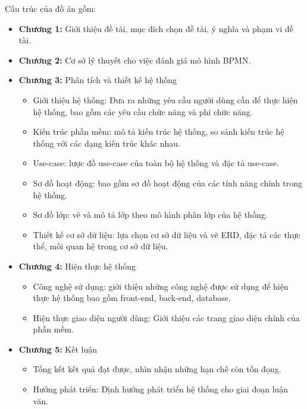 Cấu trúc của đồ án gồm:
\begin{itemize}
    \item \textbf{Chương 1:} Giới thiệu đề tài, mục đích chọn đề tài, ý nghĩa và phạm vi đề tài.
    \item \textbf{Chương 2:} Cơ sở lý thuyết cho việc đánh giá mô hình BPMN.
    \item \textbf{Chương 3:} Phân tích và thiết kế hệ thống
          \begin{itemize}
              \item Giới thiệu hệ thống: Đưa ra những yêu cầu người dùng cần để thực hiện hệ thống,
                    bao gồm các yêu cầu chức năng và phi chức năng.
              \item Kiến trúc phần mềm: mô tả kiến trúc hệ thống, so sánh kiến trúc hệ thống với
                    các dạng kiến trúc khác nhau.
              \item Use-case: lược đồ use-case của toàn bộ hệ thống và đặc tả use-case.
              \item Sơ đồ hoạt động: bao gồm sơ đồ hoạt động của các tính năng chính trong hệ
                    thống.
              \item Sơ đồ lớp: vẽ và mô tả lớp theo mô hình phân lớp của hệ thống.
              \item Thiết kế cơ sở dữ liệu: lựa chọn cơ sở dữ liệu và vẽ ERD, đặc tả các thực thể,
                    mối quan hệ trong cơ sở dữ liệu.
          \end{itemize}
    \item \textbf{Chương 4:} Hiện thực hệ thống
          \begin{itemize}
              \item Công nghệ sử dụng: giới thiệu những công nghệ được sử dụng để hiện thực hệ
                    thống bao gồm front-end, back-end, database.
              \item Hiện thực giao diện người dùng: Giới thiệu các trang giao diện chính của phần
                    mềm.
          \end{itemize}
    \item \textbf{Chương 5:} Kết luận
          \begin{itemize}
              \item Tổng kết kết quả đạt được, nhìn nhận những hạn chế còn tồn đọng.
              \item Hướng phát triển: Định hướng phát triển hệ thống cho giai đoạn luận văn.
          \end{itemize}
\end{itemize}
